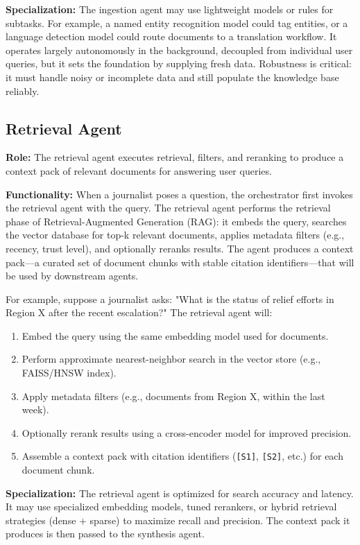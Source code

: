 \textbf{Specialization:} The ingestion agent may use lightweight models or rules for subtasks. For example, a named entity recognition model could tag entities, or a language detection model could route documents to a translation workflow. It operates largely autonomously in the background, decoupled from individual user queries, but it sets the foundation by supplying fresh data. Robustness is critical: it must handle noisy or incomplete data and still populate the knowledge base reliably.  

\subsection{Retrieval Agent}
\textbf{Role:} The retrieval agent executes retrieval, filters, and reranking to produce a context pack of relevant documents for answering user queries.  

\textbf{Functionality:} When a journalist poses a question, the orchestrator first invokes the retrieval agent with the query. The retrieval agent performs the retrieval phase of Retrieval-Augmented Generation (RAG): it embeds the query, searches the vector database for top-k relevant documents, applies metadata filters (e.g., recency, trust level), and optionally reranks results. The agent produces a context pack---a curated set of document chunks with stable citation identifiers---that will be used by downstream agents.  

For example, suppose a journalist asks: "What is the status of relief efforts in Region X after the recent escalation?" The retrieval agent will:  
\begin{enumerate}
    \item Embed the query using the same embedding model used for documents.  
    \item Perform approximate nearest-neighbor search in the vector store (e.g., FAISS/HNSW index).  
    \item Apply metadata filters (e.g., documents from Region X, within the last week).  
    \item Optionally rerank results using a cross-encoder model for improved precision.  
    \item Assemble a context pack with citation identifiers (\texttt{[S1]}, \texttt{[S2]}, etc.) for each document chunk.  
\end{enumerate}  

\textbf{Specialization:} The retrieval agent is optimized for search accuracy and latency. It may use specialized embedding models, tuned rerankers, or hybrid retrieval strategies (dense + sparse) to maximize recall and precision. The context pack it produces is then passed to the synthesis agent.

